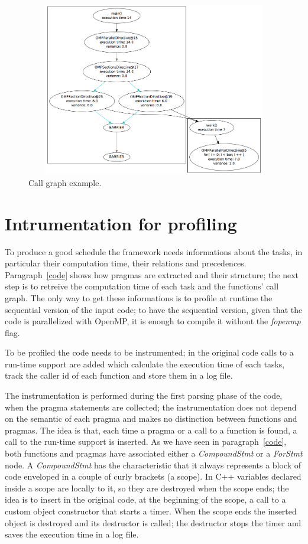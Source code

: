 \documentclass[a4paper,12pt,oneside]{book}
\begin{document}
\begin{figure}[H]
\centering
\includegraphics[width = 130mm, height = 76mm]{call_graph.png}
\caption{Call graph example.}
\label{call_graph}
\end{figure}


\section{Intrumentation for profiling}

To produce a good schedule the framework needs informations about the tasks, in particular their computation time, their relations and precedences. Paragraph~\ref{code} shows how pragmas are extracted and their structure; the next step is to retreive the computation time of each task and the functions’ call graph. The only way to get these informations is to profile at run\-time the sequential version of the input code; to have the sequential version, given that the code is parallelized with OpenMP, it is enough to compile it without the \emph{\-fopenmp} flag. 

To be profiled the code needs to be instrumented; in the original code calls to a run-time support are added which calculate the execution time of each tasks, track the caller id of each function and store them in a log file. 

The instrumentation is performed during the first parsing phase of the code, when the pragma statements are collected; the instrumentation does not depend on the semantic of each pragma and makes no distinction between functions and pragmas. The idea is that, each time a pragma or a call to a function is found, a call to the run-time support is inserted. As we have seen in paragraph~\ref{code}, both functions and pragmas have associated either a \emph{CompoundStmt} or a \emph{ForStmt} node. A \emph{CompoundStmt} has the characteristic that it always represents a block of code enveloped in a couple of curly brackets (a scope). In C++ variables declared inside a scope are locally to it, so they are destroyed when the scope ends; the idea is to insert in the original code, at the beginning of the scope, a call to a custom object constructor that starts a timer. When the scope ends the inserted object is destroyed and its destructor is called; the destructor stops the timer and saves the execution time in a log file. 
\end{document}
